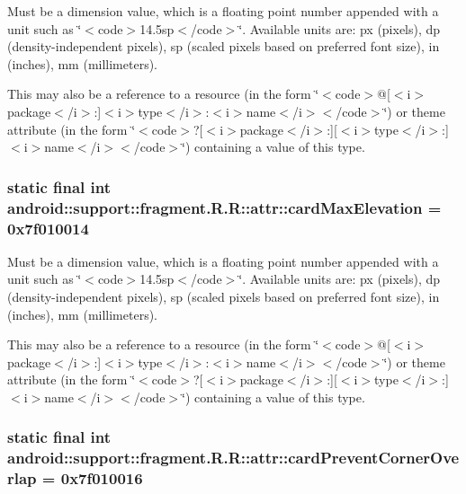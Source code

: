 Must be a dimension value, which is a floating point number appended with a unit such as \char`\"{}$<$code$>$14.5sp$<$/code$>$\char`\"{}. Available units are: px (pixels), dp (density-independent pixels), sp (scaled pixels based on preferred font size), in (inches), mm (millimeters). 

This may also be a reference to a resource (in the form \char`\"{}$<$code$>$@\mbox{[}$<$i$>$package$<$/i$>$:\mbox{]}$<$i$>$type$<$/i$>$:$<$i$>$name$<$/i$>$$<$/code$>$\char`\"{}) or theme attribute (in the form \char`\"{}$<$code$>$?\mbox{[}$<$i$>$package$<$/i$>$:\mbox{]}\mbox{[}$<$i$>$type$<$/i$>$:\mbox{]}$<$i$>$name$<$/i$>$$<$/code$>$\char`\"{}) containing a value of this type. \hypertarget{classandroid_1_1support_1_1fragment_1_1_r_1_1attr_dcc022aaa218eb55b00bdf3259413b96}{
\subsubsection[{cardMaxElevation}]{\setlength{\rightskip}{0pt plus 5cm}static final int android::support::fragment.R.R::attr::cardMaxElevation = 0x7f010014}}
\label{classandroid_1_1support_1_1fragment_1_1_r_1_1attr_dcc022aaa218eb55b00bdf3259413b96}


Must be a dimension value, which is a floating point number appended with a unit such as \char`\"{}$<$code$>$14.5sp$<$/code$>$\char`\"{}. Available units are: px (pixels), dp (density-independent pixels), sp (scaled pixels based on preferred font size), in (inches), mm (millimeters). 

This may also be a reference to a resource (in the form \char`\"{}$<$code$>$@\mbox{[}$<$i$>$package$<$/i$>$:\mbox{]}$<$i$>$type$<$/i$>$:$<$i$>$name$<$/i$>$$<$/code$>$\char`\"{}) or theme attribute (in the form \char`\"{}$<$code$>$?\mbox{[}$<$i$>$package$<$/i$>$:\mbox{]}\mbox{[}$<$i$>$type$<$/i$>$:\mbox{]}$<$i$>$name$<$/i$>$$<$/code$>$\char`\"{}) containing a value of this type. \hypertarget{classandroid_1_1support_1_1fragment_1_1_r_1_1attr_0e4a6f023da69d85d6606a01bcf32f7b}{
\subsubsection[{cardPreventCornerOverlap}]{\setlength{\rightskip}{0pt plus 5cm}static final int android::support::fragment.R.R::attr::cardPreventCornerOverlap = 0x7f010016}}
\label{classandroid_1_1support_1_1fragment_1_1_r_1_1attr_0e4a6f023da69d85d6606a01bcf32f7b}


